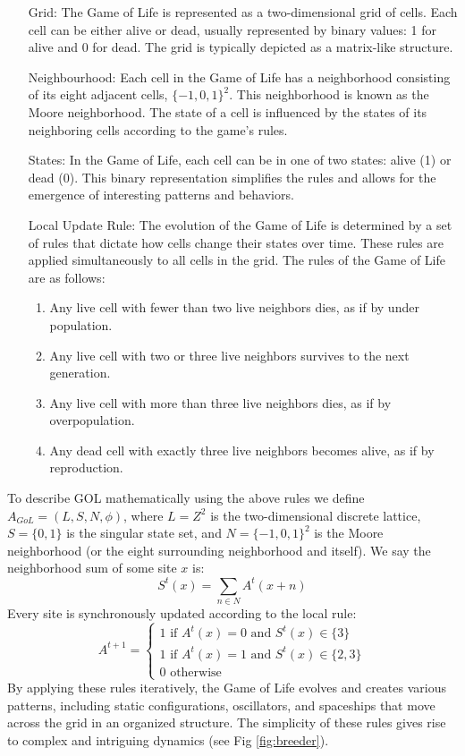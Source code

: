 \begin{enumerate}[align=left]
	\item[Grid:] The Game of Life is represented as a two-dimensional grid of cells. Each cell can be either alive or dead, usually represented by binary values: 1 for alive and 0 for dead. The grid is typically depicted as a matrix-like structure.
	\item[Neighbourhood:] Each cell in the Game of Life has a neighborhood consisting of its eight adjacent cells, $\{-1, 0, 1\}^{2}$. This neighborhood is known as the Moore neighborhood. The state of a cell is influenced by the states of its neighboring cells according to the game's rules.
	\item[States:] In the Game of Life, each cell can be in one of two states: alive (1) or dead (0). This binary representation simplifies the rules and allows for the emergence of interesting patterns and behaviors.
	\item[Local Update Rule:] The evolution of the Game of Life is determined by a set of rules that dictate how cells change their states over time. These rules are applied simultaneously to all cells in the grid. The rules of the Game of Life are as follows:
	\begin{enumerate}
		\item Any live cell with fewer than two live neighbors dies, as if by under population.
		\item Any live cell with two or three live neighbors survives to the next generation.
		\item Any live cell with more than three live neighbors dies, as if by overpopulation.
		\item Any dead cell with exactly three live neighbors becomes alive, as if by reproduction.
	\end{enumerate}
\end{enumerate}
To describe GOL mathematically using the above rules we define $A_{GoL} = (L, S, N, \phi )$, where $L=Z^{2}$ is the two-dimensional discrete lattice, $S=\{ 0, 1 \}$ is the singular state set, and $N = \{ -1, 0, 1 \} ^{2}$ is the Moore neighborhood (or the eight surrounding neighborhood and itself). We say the neighborhood sum of some site $x$ is:
\begin{equation}
	S^{t}(x) = \sum_{n \in N}A^{t}(x+n)
\end{equation}
Every site is synchronously updated according to the local rule:
\begin{equation}
	A^{t+1} = \begin{cases}
		1 \text{ if } A^{t}(x) = 0 \text{ and } S^{t}(x) \in \{3 \} \\
		1 \text{ if } A^{t}(x) = 1 \text{ and } S^{t}(x) \in \{2, 3 \} \\
		0 \text{ otherwise }
	\end{cases}
\end{equation}
By applying these rules iteratively, the Game of Life evolves and creates various patterns, including static configurations, oscillators, and spaceships that move across the grid in an organized structure. The simplicity of these rules gives rise to complex and intriguing dynamics (see Fig \ref{fig:breeder}).

